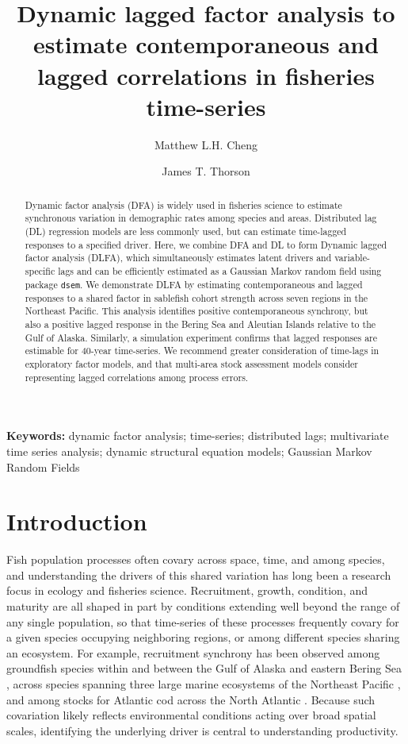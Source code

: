 \documentclass[12pt]{article}
\date{\vspace{-1.5em}}
\title{\large Dynamic lagged factor analysis to estimate contemporaneous and lagged correlations in fisheries time-series}
\author[1,2]{Matthew L.H. Cheng}
\author[3]{James T. Thorson}
\affil[1]{College of Fisheries and Ocean Sciences, University of Alaska Fairbanks, Juneau, AK, USA}
\affil[2]{Auke Bay Laboratories, Alaska Fisheries Science Center, National Marine Fisheries Service, NOAA, Juneau, AK 99801, USA}
\affil[3]{Technical University of Denmark, Kongens Lyngby, Denmark}
\begin{document}
\maketitle

\begin{abstract}
\noindent Dynamic factor analysis (DFA) is widely used in fisheries
science to estimate synchronous variation in demographic rates among
species and areas. Distributed lag (DL) regression models are less
commonly used, but can estimate time-lagged responses to a specified
driver. Here, we combine DFA and DL to form Dynamic lagged factor
analysis (DLFA), which simultaneously estimates latent drivers and
variable-specific lags and can be efficiently estimated as a Gaussian
Markov random field using package \texttt{dsem}. We demonstrate DLFA by
estimating contemporaneous and lagged responses to a shared factor in
sablefish cohort strength across seven regions in the Northeast Pacific.
This analysis identifies positive contemporaneous synchrony, but also a
positive lagged response in the Bering Sea and Aleutian Islands relative
to the Gulf of Alaska. Similarly, a simulation experiment confirms that
lagged responses are estimable for 40-year time-series. We recommend
greater consideration of time-lags in exploratory factor models, and
that multi-area stock assessment models consider representing lagged
correlations among process errors.
\end{abstract}

\noindent\textbf{Keywords:} dynamic factor analysis; time-series;
distributed lags; multivariate time series analysis; dynamic structural
equation models; Gaussian Markov Random Fields

\clearpage

\section{Introduction}
\label{sec:intro}

Fish population processes often covary across space, time, and among
species, and understanding the drivers of this shared variation has long
been a research focus in ecology and fisheries science. Recruitment, growth, condition, and
maturity are all shaped in part by conditions extending well beyond the
range of any single population, so that time-series of these processes
frequently covary for a given species occupying neighboring regions, or
among different species sharing an ecosystem. For example, recruitment
synchrony has been observed among groundfish species within and between
the Gulf of Alaska and eastern Bering Sea \citep[e.g.,][]{mueter_2007},
across species spanning three large marine ecosystems of the Northeast
Pacific \citep{stachura_2014}, and among stocks for Atlantic cod across
the North Atlantic \citep{minto_productivity_2014}. Because such
covariation likely reflects environmental conditions acting over broad
spatial scales, identifying the underlying driver is central to
understanding productivity.
\end{document}
